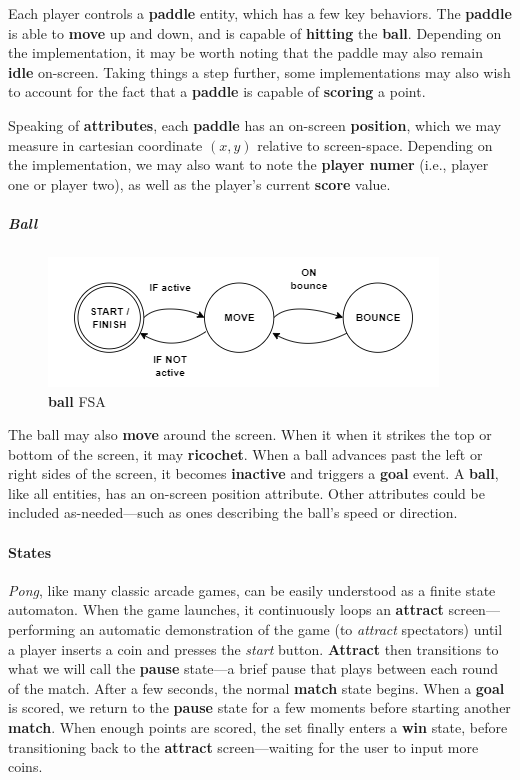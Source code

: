 \documentclass{report}
\newcommand{\state}[1]{\textbf{#1}}
\newcommand{\pad}{\textbf{paddle}\xspace}
\newcommand{\ball}{\textbf{ball}\xspace}
\begin{document}
Each player controls a \pad entity, which has a few key behaviors. The \pad is able to \state{move} up and down, and is capable of \state{hitting} the \ball. Depending on the implementation, it may be worth noting that the paddle may also remain \state{idle} on-screen. Taking things a step further, some implementations may also wish to account for the fact that a \pad is capable of \state{scoring} a point. 

Speaking of \state{attributes}, each \pad has an on-screen \state{position}, which we may measure in cartesian coordinate $(x,y)$ relative to screen-space. Depending on the implementation, we may also want to note the \state{player numer} (i.e., player one or player two), as well as the player's current \state{score} value. 

\subparagraph{Ball} 

\begin{figure}
    \includegraphics[width=\textwidth]{BallFSA.png}
    \caption{\ball FSA}
    \label{fig:ballFSA}
\end{figure}

The ball may also \state{move} around the screen. When it when it strikes the top or bottom of the screen, it may \state{ricochet}. When a ball advances past the left or right sides of the screen, it becomes \state{inactive} and triggers a \state{goal} event.
A \ball, like all entities, has an on-screen position attribute. Other attributes could be included as-needed---such as ones describing the ball's speed or direction.

\paragraph{States} 

\emph{Pong}, like many classic arcade games, can be easily understood as a finite state automaton. When the game launches, it continuously loops an \state{attract} screen---performing an automatic demonstration of the game (to \emph{attract} spectators) until a player inserts a coin and presses the \emph{start} button. \state{Attract} then transitions to what we will call the \state{pause} state---a brief pause that plays between each round of the match. After a few seconds, the normal \state{match} state begins. When a \state{goal} is scored, we return to the \state{pause} state for a few moments before starting another \state{match}. When enough points are scored, the set finally enters a \state{win} state, before transitioning back to the \state{attract} screen---waiting for the user to input more coins. 
\end{document}
